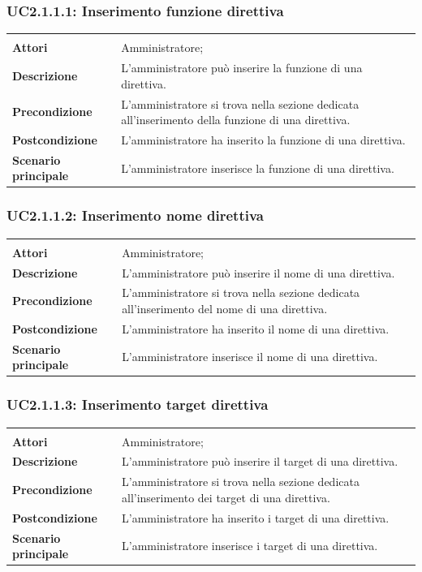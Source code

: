 \subsubsection{UC2.1.1.1: Inserimento funzione direttiva}
\label{UC2.1.1.1}
\begin{longtable}{l|p{10cm}}
\hline
&\\
\textbf{Attori} & Amministratore;\\[7pt]
\textbf{Descrizione} & L'amministratore può inserire la funzione di una direttiva.\\[7pt]
\textbf{Precondizione} & L'amministratore si trova nella sezione dedicata all'inserimento della funzione di una direttiva.\\[7pt]
\textbf{Postcondizione} & L'amministratore ha inserito la funzione di una direttiva.\\[7pt]
\textbf{Scenario principale} & L'amministratore inserisce la funzione di una direttiva.\\[7pt]\hline
\end{longtable}

\subsubsection{UC2.1.1.2: Inserimento nome direttiva}
\label{UC2.1.1.2}
\begin{longtable}{l|p{10cm}}
\hline
&\\
\textbf{Attori} & Amministratore;\\[7pt]
\textbf{Descrizione} & L'amministratore può inserire il nome di una direttiva.\\[7pt]
\textbf{Precondizione} & L'amministratore si trova nella sezione dedicata all'inserimento del nome di una direttiva.\\[7pt]
\textbf{Postcondizione} & L'amministratore ha inserito il nome di una direttiva.\\[7pt]
\textbf{Scenario principale} & L'amministratore inserisce il nome di una direttiva.\\[7pt]\hline
\end{longtable}

\subsubsection{UC2.1.1.3: Inserimento target direttiva}
\label{UC2.1.1.3}
\begin{longtable}{l|p{10cm}}
\hline
&\\
\textbf{Attori} & Amministratore;\\[7pt]
\textbf{Descrizione} & L'amministratore può inserire il target di una direttiva.\\[7pt]
\textbf{Precondizione} & L'amministratore si trova nella sezione dedicata all'inserimento dei target di una direttiva.\\[7pt]
\textbf{Postcondizione} & L'amministratore ha inserito i target di una direttiva.\\[7pt]
\textbf{Scenario principale} & L'amministratore inserisce i target di una direttiva.\\[7pt]\hline
\end{longtable}

